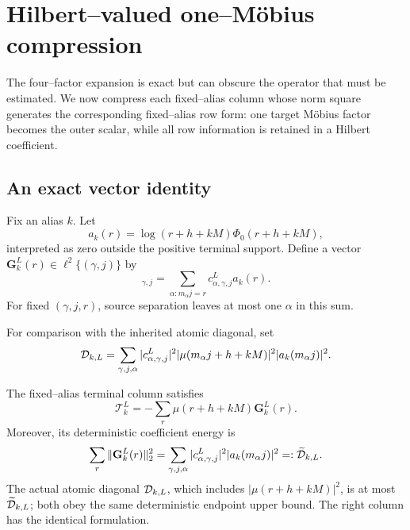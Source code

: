 \section{Hilbert--valued one--M\"obius compression}
\label{sec:tpc41-hilbert}

The four--factor expansion is exact but can obscure the operator that
must be estimated.  We now compress each fixed--alias column whose norm
square generates the corresponding fixed--alias row form: one target
M\"obius factor becomes the outer scalar, while all row information is
retained in a Hilbert coefficient.

\subsection{An exact vector identity}

Fix an alias \(k\).  Let
\begin{equation}
 a_k(r)=\log(r+h+kM)\Phi_0(r+h+kM),
 \label{eq:tpc41-hilbert-ak}
\end{equation}
interpreted as zero outside the positive terminal support.  Define a
vector \(\mathbf G_k^L(r)\in\ell^2\{(\gamma,j)\}\) by
\begin{equation}
 [\mathbf G_k^L(r)]_{\gamma,j}
 =\sum_{\alpha:m_\alpha j=r}
   c^L_{\alpha,\gamma,j}a_k(r).
 \label{eq:tpc41-hilbert-G}
\end{equation}
For fixed \((\gamma,j,r)\), source separation leaves at most one
\(\alpha\) in this sum.

For comparison with the inherited atomic diagonal, set
\begin{equation}
 \mathcal D_{k,L}
 =\sum_{\gamma,j,\alpha}
 |c^L_{\alpha,\gamma,j}|^2
 |\mu(m_\alpha j+h+kM)|^2|a_k(m_\alpha j)|^2.
 \label{eq:tpc41-Hilbert-actual-diagonal}
\end{equation}

\begin{proposition}
\label{prop:tpc41-Hilbert-compression}
The fixed--alias terminal column satisfies
\begin{equation}
 \boxed{
 \mathscr T_k^L
 =-\sum_r\mu(r+h+kM)\mathbf G_k^L(r).}
 \label{eq:tpc41-Hilbert-compression}
\end{equation}
Moreover, its deterministic coefficient energy is
\begin{equation}
 \sum_r\|\mathbf G_k^L(r)\|_2^2
 =\sum_{\gamma,j,\alpha}
 |c^L_{\alpha,\gamma,j}|^2
 |a_k(m_\alpha j)|^2
 =:\widetilde{\mathcal D}_{k,L}.
 \label{eq:tpc41-Hilbert-coefficient-energy}
\end{equation}
The actual atomic diagonal \(\mathcal D_{k,L}\), which includes
\(|\mu(r+h+kM)|^2\), is at most \(\widetilde{\mathcal D}_{k,L}\); both obey the
same deterministic endpoint upper bound.  The right column has the
identical formulation.
\end{proposition}

